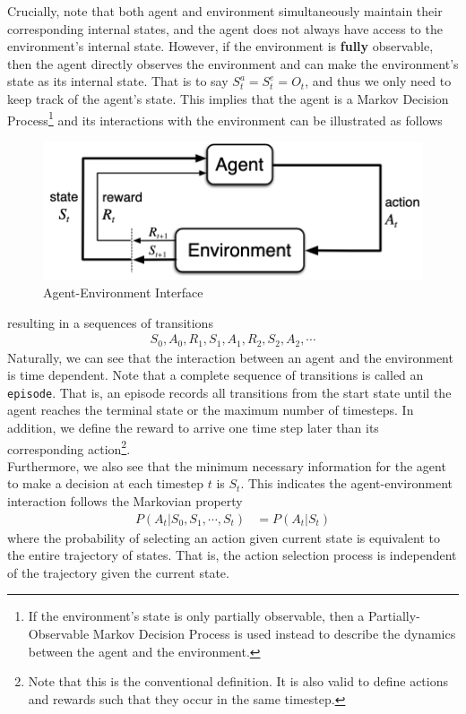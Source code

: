 \documentclass[12pt]{report}
\begin{document}
Crucially, note that both agent and environment simultaneously maintain their corresponding internal states, and the agent does not always have access to the environment's internal state. However, if the environment is \textbf{fully} observable, then the agent directly observes the environment and can make the environment's state as its internal state. That is to say $S_t^a = S_t^e = O_t$, and thus we only need to keep track of the agent's state. This implies that the agent is a Markov Decision Process\footnote{If the environment's state is only partially observable, then a Partially-Observable Markov Decision Process is used instead to describe the dynamics between the agent and the environment.} and its interactions with the environment can be illustrated \cite{sutton2018reinforcement} as follows
\begin{figure}[H]
    \center
    \includegraphics[width=0.8\linewidth]{figs/agent-env.png}
    \caption{Agent-Environment Interface}
    \label{fig:agent-env}
\end{figure}
resulting in a sequences of transitions
\begin{align}
    S_0, A_0, R_1, S_1, A_1, R_2, S_2, A_2, \cdots
\end{align}
Naturally, we can see that the interaction between an agent and the environment is time dependent. Note that a complete sequence of transitions is called an \texttt{episode}. That is, an episode records all transitions from the start state until the agent reaches the terminal state or the maximum number of timesteps. In addition, we define the reward to arrive one time step later than its corresponding action\footnote{Note that this is the conventional definition. It is also valid to define actions and rewards such that they occur in the same timestep.}.\\

Furthermore, we also see that the minimum necessary information for the agent to make a decision at each timestep $t$ is $S_t$. This indicates the agent-environment interaction follows the Markovian property
\begin{align}
    P(A_t|S_0, S_1, \cdots, S_t) &= P(A_t|S_t)
\end{align}
where the probability of selecting an action given current state is equivalent to the entire trajectory of states. That is, the action selection process is independent of the trajectory given the current state.
\end{document}
